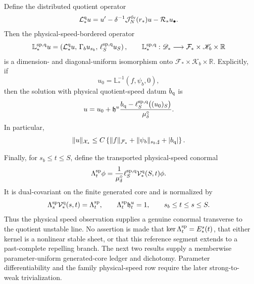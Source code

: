 \begin{theorem}
Define the distributed quotient operator
\begin{equation}
 \mathcal L_*^{\rm q}u
 =u'-\delta^{-1}\mathcal J_N^{\rm fv}(r_*)u
       -\mathcal R_*u_\bullet.                  \label{eq:physical-speed-distributed-operator}
\end{equation}
Then the physical-speed-bordered operator
\begin{equation}
 \mathbb L_*^{\rm sp,q}u
 =\left(\mathcal L_*^{\rm q}u,\,
        \Gamma_bu_{s_b},\,
        \ell_S^{\rm sp,q}u_S\right),
 \qquad
 \mathbb L_*^{\rm sp,q}:\mathscr D_*
 \longrightarrow\mathcal F_*\times\mathscr K_b\times\mathbb R
                                                        \label{eq:physical-speed-bordered-operator}
\end{equation}
is a dimension- and diagonal-uniform isomorphism onto
\(\mathcal F_*\times\mathscr K_b\times\mathbb R\).  Explicitly, if
\begin{equation}
 u_0=\mathbb L_*^{-1}(f,\psi_b,0),
\end{equation}
then the solution with physical quotient-speed datum \(b_{\rm q}\) is
\begin{equation}
 u=u_0+\mathfrak h^u
   \frac{b_{\rm q}-\ell_S^{\rm sp,q}\bigl((u_0)_S\bigr)}
        {\mu_\delta^\circ}.                    \label{eq:physical-speed-bordered-inverse}
\end{equation}
In particular,
\begin{equation}
 \|u\|_{\mathcal X_*}
 \le C\left\{\|f\|_{\mathcal F_*}
       +\|\psi_b\|_{s_b,\sharp}+|b_{\rm q}|\right\}.
                                                        \label{eq:physical-speed-bordered-green-bound}
\end{equation}

Finally, for \(s_b\le t\le S\), define the transported physical-speed
conormal
\begin{equation}
 \Lambda_t^{\rm sp}\phi
 =\frac1{\mu_\delta^\circ}
   \ell_S^{\rm sp,q}\mathcal V_*^{\rm q}(S,t)\phi.
                                                        \label{eq:physical-speed-transported-conormal}
\end{equation}
It is dual-covariant on the finite generated core and is normalized by
\begin{equation}
 \Lambda_s^{\rm sp}\mathcal V_*^{\rm q}(s,t)
 =\Lambda_t^{\rm sp},
 \qquad
 \Lambda_t^{\rm sp}\mathfrak h_t^u=1,
 \qquad s_b\le t\le s\le S.                   \label{eq:physical-speed-conormal-identities}
\end{equation}
Thus the physical speed observation supplies a genuine conormal transverse
to the quotient unstable line.  No assertion is made that
\(\ker\Lambda_t^{\rm sp}=E_*^s(t)\), that either kernel is a nonlinear
stable sheet, or that this reference segment extends to a past-complete
repelling branch.  The next two results supply a memberwise
parameter-uniform generated-core ledger and dichotomy.  Parameter
differentiability and the family physical-speed row require the later
strong-to-weak trivialization.
\end{theorem}

